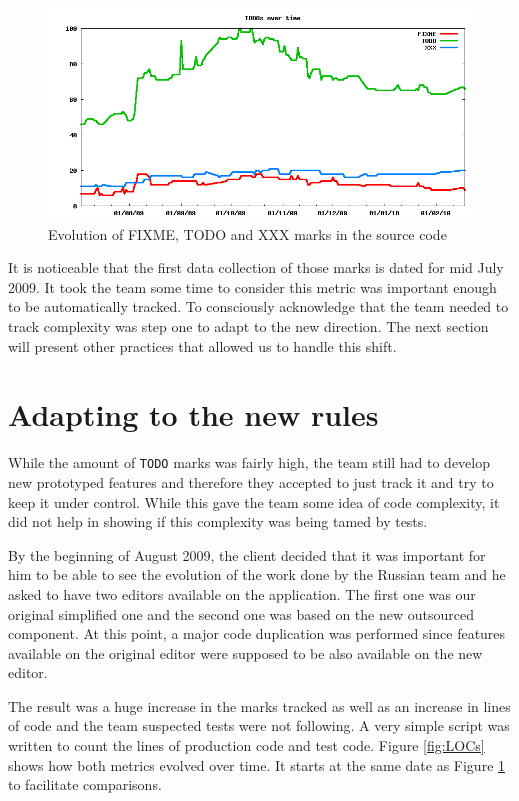 \documentclass[lnbip]{svmultln}
\begin{document}
\begin{figure}[hbt]
  \centerline{
    \includegraphics[width=120mm]{TODOs.png}
  }
  \caption{Evolution of FIXME, TODO and XXX marks in the source code}
  \label{fig:TODOs}
\end{figure}

It is noticeable that the first data collection of those marks is
dated for mid July 2009. It took the team some time to consider this
metric was important enough to be automatically tracked. To
consciously acknowledge that the team needed to track complexity was
step one to adapt to the new direction. The next section will present
other practices that allowed us to handle this shift.

\section{Adapting to the new rules}
\label{sec:adapting}

While the amount of \texttt{TODO} marks was fairly high, the team
still had to develop new prototyped features and therefore they
accepted to just track it and try to keep it under control. While this
gave the team some idea of code complexity, it did not help in showing
if this complexity was being tamed by tests.

By the beginning of August 2009, the client decided that it was
important for him to be able to see the evolution of the work done by
the Russian team and he asked to have two editors available on the
application. The first one was our original simplified one and the second
one was based on the new outsourced component. At this point, a major
code duplication was performed since features available on the original
editor were supposed to be also available on the new editor.

The result was a huge increase in
the marks tracked as well as an increase in lines of code and the team
suspected tests were not following. A very simple script was written
to count the lines of production code and test code. Figure
\ref{fig:LOCs} shows how both metrics evolved over time. It starts at
the same date as Figure \ref{fig:TODOs} to facilitate comparisons.
\end{document}
